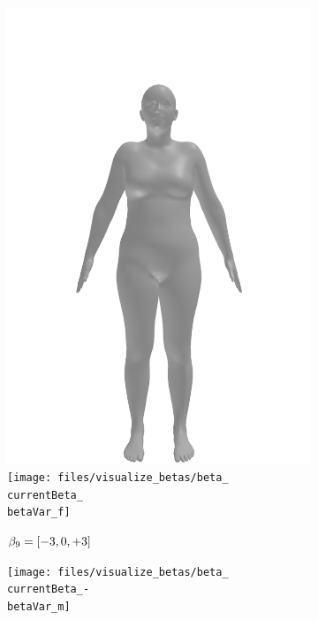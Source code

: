 \begin{figure}[ht!]
\begin{subfigure}{\betaWidth}
        \includegraphics[width=\imgWidth]{files/visualize_betas/baseline_f}
        \texttt{[image: files/visualize\_betas/beta\_\\currentBeta\_\\betaVar\_f]}
        \caption{$\beta_9 = [-3, 0, +3]$}
    \end{subfigure}
    \begin{subfigure}{\betaWidth}
        \def\currentBeta{9}
        \centering
        \texttt{[image: files/visualize\_betas/beta\_\\currentBeta\_-\\betaVar\_m]}

\end{subfigure}
\end{figure}
